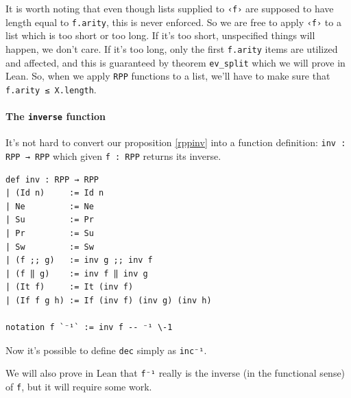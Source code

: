 \documentclass[oneside]{book}
\theoremstyle{definition}
\theoremstyle{remark}
\theoremstyle{plain}
\begin{document}
It is worth noting that even though lists supplied to \lstinline{‹f›} are supposed to have length equal to \lstinline{f.arity},
this is never enforced.
So we are free to apply \lstinline{‹f›} to a list which is too short or too long.
If it's too short, unspecified things will happen, we don't care.
If it's too long, only the first \lstinline{f.arity} items are utilized and affected,
and this is guaranteed by theorem \lstinline{ev_split} which we will prove in Lean.
So, when we apply \lstinline{RPP} functions to a list, we'll have to make sure that
\lstinline{f.arity ≤ X.length}.

\paragraph{The \lstinline{inverse} function}
It's not hard to convert our proposition \ref{rppinv} into a function definition:
\lstinline{inv : RPP → RPP} which given \lstinline{f : RPP} returns its inverse.
\begin{lstlisting}
def inv : RPP → RPP
| (Id n)     := Id n
| Ne         := Ne
| Su         := Pr
| Pr         := Su
| Sw         := Sw
| (f ;; g)   := inv g ;; inv f
| (f ‖ g)    := inv f ‖ inv g
| (It f)     := It (inv f)
| (If f g h) := If (inv f) (inv g) (inv h)

notation f `⁻¹` := inv f -- ⁻¹ \-1
\end{lstlisting}
Now it's possible to define \lstinline{dec} simply as \lstinline{inc⁻¹}.

We will also prove in Lean that \lstinline{f⁻¹} really is the inverse (in the functional sense) of \lstinline{f},
but it will require some work.
\end{document}

